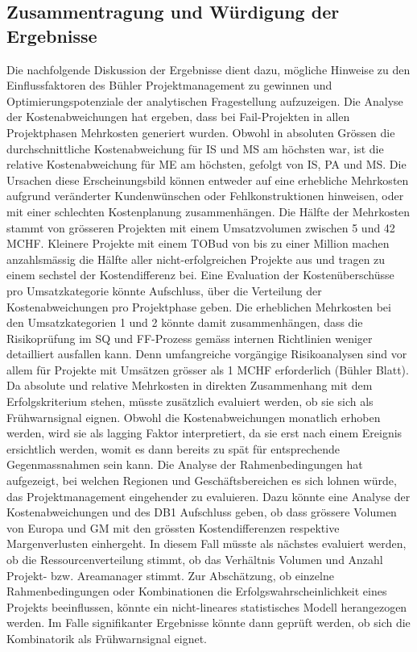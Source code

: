\subsection{Zusammentragung und Würdigung der Ergebnisse}\label{sec:krit}
Die nachfolgende Diskussion der Ergebnisse dient dazu, mögliche Hinweise zu den Einflussfaktoren des Bühler Projektmanagement zu gewinnen und Optimierungspotenziale der analytischen Fragestellung aufzuzeigen. 
\newline
Die Analyse der Kostenabweichungen hat ergeben, dass bei Fail-Projekten in allen Projektphasen Mehrkosten generiert wurden. Obwohl in absoluten Grössen die durchschnittliche Kostenabweichung für IS und MS am höchsten war, ist die relative Kostenabweichung für ME am höchsten, gefolgt von IS, PA und MS. Die Ursachen diese Erscheinungsbild können entweder auf eine erhebliche Mehrkosten aufgrund veränderter Kundenwünschen oder Fehlkonstruktionen hinweisen, oder mit einer schlechten Kostenplanung zusammenhängen. Die Hälfte der Mehrkosten stammt von grösseren Projekten mit einem Umsatzvolumen zwischen 5 und 42 MCHF. Kleinere Projekte mit einem TOBud von bis zu einer Million machen anzahlsmässig die Hälfte aller nicht-erfolgreichen Projekte aus und tragen zu einem sechstel der Kostendifferenz bei. Eine Evaluation der Kostenüberschüsse pro Umsatzkategorie könnte Aufschluss, über die Verteilung der Kostenabweichungen pro Projektphase geben. Die erheblichen Mehrkosten bei den Umsatzkategorien 1 und 2 könnte damit zusammenhängen, dass die Risikoprüfung im SQ und FF-Prozess gemäss internen Richtlinien weniger detailliert ausfallen kann. Denn umfangreiche vorgängige Risikoanalysen sind vor allem für Projekte mit Umsätzen grösser als 1 MCHF erforderlich (Bühler Blatt).  Da absolute und relative Mehrkosten in direkten Zusammenhang mit dem Erfolgskriterium stehen, müsste zusätzlich evaluiert werden, ob sie sich als Frühwarnsignal eignen. Obwohl die Kostenabweichungen monatlich erhoben werden, wird sie als lagging Faktor interpretiert, da sie erst nach einem Ereignis ersichtlich werden, womit es dann bereits zu spät für entsprechende Gegenmassnahmen sein kann.
\newline Die Analyse der Rahmenbedingungen hat aufgezeigt, bei welchen Regionen und Geschäftsbereichen es sich lohnen würde, das Projektmanagement eingehender zu evaluieren. Dazu könnte eine Analyse der Kostenabweichungen und des DB1 Aufschluss geben, ob dass grössere Volumen von Europa und GM mit den grössten Kostendifferenzen respektive Margenverlusten einhergeht. In diesem Fall müsste als nächstes evaluiert werden, ob die Ressourcenverteilung stimmt, ob das Verhältnis Volumen und Anzahl Projekt- bzw. Areamanager stimmt. Zur Abschätzung, ob einzelne Rahmenbedingungen oder Kombinationen die Erfolgswahrscheinlichkeit eines Projekts beeinflussen, könnte ein nicht-lineares statistisches Modell herangezogen werden. Im Falle signifikanter Ergebnisse könnte dann geprüft werden, ob sich die Kombinatorik als Frühwarnsignal eignet.
